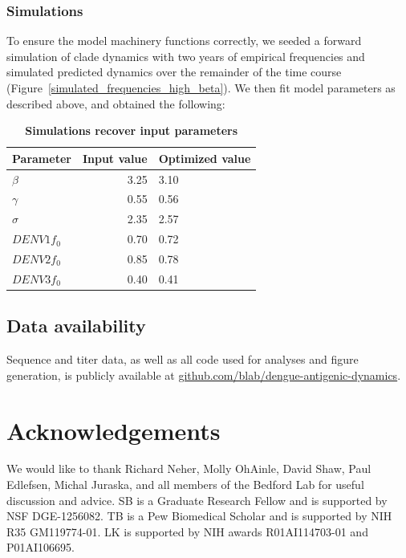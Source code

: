 \documentclass[11pt,oneside,letterpaper]{article}
\begin{document}
\subsubsection{Simulations}
To ensure the model machinery functions correctly, we seeded a forward simulation of clade dynamics with two years of empirical frequencies and simulated predicted dynamics over the remainder of the time course (Figure~\ref{simulated_frequencies_high_beta}).
We then fit model parameters as described above, and obtained the following:

\begin{table}[ht!]
  \begin{center}
    \label{simulation_parameters}
    \begin{tabular}{l|r|l}
      Parameter & Input value & Optimized value\\
      \hline
      $\beta$ & 3.25 & 3.10 \\
      $\gamma$ & 0.55 & 0.56 \\
      $\sigma$ & 2.35 & 2.57 \\
      $DENV1 f_{0}$ & 0.70 & 0.72 \\
      $DENV2 f_{0}$ & 0.85 & 0.78 \\
      $DENV3 f_{0}$ & 0.40 & 0.41 \\
    \end{tabular}
    \caption{
    \textbf{Simulations recover input parameters}
    }
  \end{center}
\end{table}


\subsection*{Data availability}
Sequence and titer data, as well as all code used for analyses and figure generation, is publicly available at \href{https://github.com/blab/dengue-antigenic-dynamics}{github.com/blab/dengue-antigenic-dynamics}.

\section*{Acknowledgements}
We would like to thank Richard Neher, Molly OhAinle, David Shaw, Paul Edlefsen, Michal Juraska, and all members of the Bedford Lab for useful discussion and advice.
SB is a Graduate Research Fellow and is supported by NSF DGE-1256082.
TB is a Pew Biomedical Scholar and is supported by NIH R35 GM119774-01.
LK is supported by NIH awards R01AI114703-01 and P01AI106695.
\end{document}
